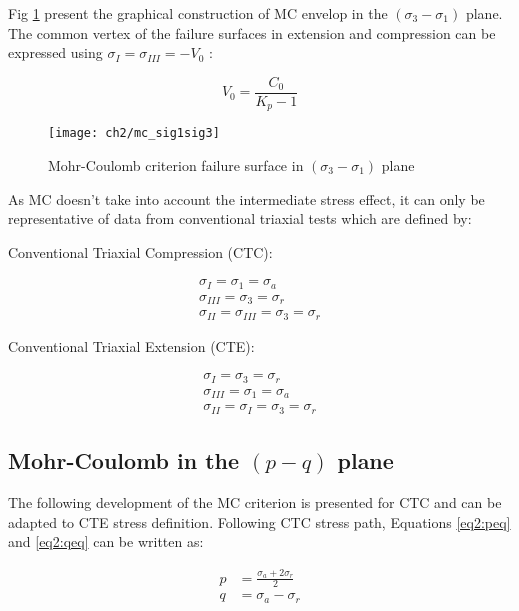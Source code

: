 Fig \ref{fig2:mc_sig1sig3} present the graphical construction of MC envelop in the $(\sigma_3 -\sigma_1)$ plane. The common vertex of the failure surfaces in extension and compression can be expressed using $\sigma_I = \sigma_{III} = -V_0$ :

\begin{equation}
    V_0 = \frac{C_0}{K_p-1}
\end{equation}


\begin{figure}[tb]
    \centering
    \texttt{[image: ch2/mc\_sig1sig3]}
    \caption{Mohr-Coulomb criterion failure surface in  $(\sigma_3 -\sigma_1)$ plane}
    \label{fig2:mc_sig1sig3}
\end{figure}

As MC doesn’t take into account the intermediate stress effect, it can only be representative of data from conventional triaxial tests which are defined by:

Conventional Triaxial Compression (CTC): 

\begin{align*}
    \sigma_I = \sigma_1 = \sigma_a \\
    \sigma_{III} = \sigma_3 = \sigma_r\\
    \sigma_{II} = \sigma_{III} = \sigma_3 = \sigma_r
\end{align*}

Conventional Triaxial Extension (CTE):

\begin{align*}
    \sigma_I = \sigma_3 = \sigma_r \\
    \sigma_{III} = \sigma_1 = \sigma_a\\
    \sigma_{II} = \sigma_{I} = \sigma_3 = \sigma_r
\end{align*}

\subsection{Mohr-Coulomb in the \texorpdfstring{$(p - q)$}{p - q} plane} \label{ch2:MC-pq}

The following development of the MC criterion is presented for CTC and can be adapted to CTE stress definition. Following CTC stress path, Equations \ref{eq2:peq} and \ref{eq2:qeq} can be written as: 

\begin{align}
    p &= \frac{\sigma_a+2\sigma_r}{2} \label{eq2:p2} \\
    q &= \sigma_a - \sigma_r \label{eq2:q2}
\end{align}

